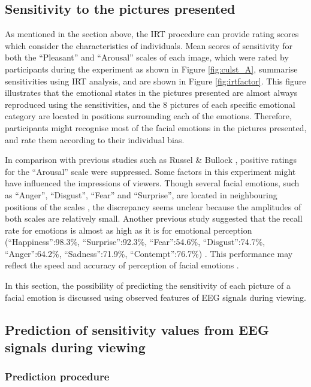 \documentclass[fonts]{icst}
\begin{document}
\subsection{Sensitivity to the pictures presented}

As mentioned in the section above, the IRT procedure can provide 
rating scores which consider the characteristics of individuals. 
Mean scores of sensitivity for both the ``Pleasant'' and ``Arousal'' scales
of each image, which were rated by participants during the experiment
as shown in Figure \ref{fig:culst_A},
summarise sensitivities using IRT analysis, and are shown in Figure
\ref{fig:irtfactor}. 
This figure illustrates that the emotional states in the pictures
presented are almost always reproduced using the sensitivities, and the 8
pictures of each specific emotional category are located in positions
surrounding each of the emotions.
Therefore, participants might recognise most of the facial emotions in 
the pictures presented, and rate them according to their individual bias.

In comparison with previous studies such as Russel \& Bullock
\cite{russel85}, positive ratings for the ``Arousal'' scale were
suppressed.  
Some factors in this experiment might have influenced the impressions of
viewers. 
Though several facial emotions, such as ``Anger'', ``Disgust'', ``Fear''
and ``Surprise'', are located in neighbouring positions of the scales
\cite{russel85},  
the discrepancy seems unclear because the amplitudes of both scales are
relatively small. 
Another previous study suggested that the recall rate for emotions is almost
as high as it is for emotional perception  
(``Happiness'':98.3\%, ``Surprise'':92.3\%, ``Fear'':54.6\%, ``Disgust'':74.7\%,
``Anger'':64.2\%, ``Sadness'':71.9\%, ``Contempt'':76.7\%) 
\cite{biehl97}.
This performance may reflect the speed and accuracy of perception of
facial emotions \cite{colonnello19,kirouac84,sherer11}.

In this section, the possibility of predicting the sensitivity of
each picture of a facial emotion is discussed using observed features of EEG
signals during viewing. 


\subsection{Prediction of sensitivity values from EEG signals during viewing}

\subsubsection{Prediction procedure}
\end{document}
